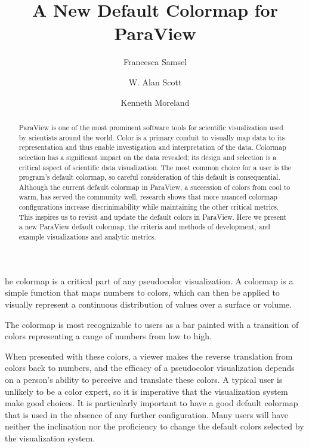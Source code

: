 \documentclass{IEEEcsmag}
\begin{document}

\title{A New Default Colormap for ParaView}

\author{Francesca Samsel}

\author{W. Alan Scott}

\author{Kenneth Moreland}




\begin{abstract}
ParaView is one of the most prominent software tools for scientific visualization used by scientists around the world.
Color is a primary conduit to visually map data to its representation and thus enable investigation and interpretation of the data.
Colormap selection has a significant impact on the data revealed; its design and selection is a critical aspect of scientific data visualization.
The most common choice for a user is the program's default colormap, so careful consideration of this default is consequential.
Although the current default colormap in ParaView, a succession of colors from cool to warm, has served the community well, research shows that more nuanced colormap configurations increase discrinimability while maintaining the other critical metrics. 
This inspires us to revisit and update the default colors in ParaView.
Here we present a new ParaView default colormap, the criteria and methods of development, and example visualizations and analytic metrics.
\end{abstract}

\maketitle

he colormap is a critical part of any pseudocolor visualization.
A colormap is a simple function that maps numbers to colors, which can then be applied to visually represent a continuous distribution of values over a surface or volume.

The colormap is most recognizable to users as a bar painted with a transition of colors representing a range of numbers from low to high.

When presented with these colors, a viewer makes the reverse translation from colors back to numbers, and the efficacy of a pseudocolor visualization depends on a person's ability to perceive and translate these colors. A typical user is unlikely to be a color expert, so it is imperative that the visualization system make good choices. It is particularly important to have a good default colormap that is used in the absence of any further configuration. Many users will have neither the inclination nor the proficiency to change the default colors selected by the visualization system.
\end{document}
